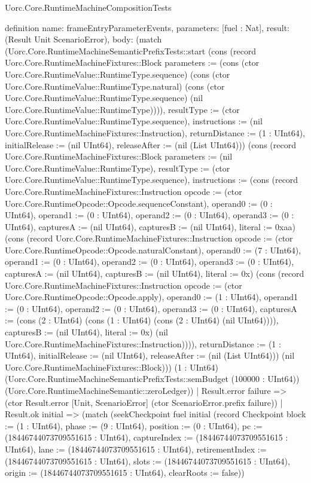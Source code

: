 \begin{lexlean}{Uorc.Core.RuntimeMachineCompositionTests}
\begin{semanticmodule}
definition{
  name: frameEntryParameterEvents,
  parameters: [fuel : Nat],
  result: (Result Unit ScenarioError),
  body: (match (Uorc.Core.RuntimeMachineSemanticPrefixTests::start (cons (record Uorc.Core.RuntimeMachineFixtures::Block {parameters := (cons (ctor Uorc.Core.RuntimeValue::RuntimeType.sequence) (cons (ctor Uorc.Core.RuntimeValue::RuntimeType.natural) (cons (ctor Uorc.Core.RuntimeValue::RuntimeType.sequence) (nil Uorc.Core.RuntimeValue::RuntimeType)))), resultType := (ctor Uorc.Core.RuntimeValue::RuntimeType.sequence), instructions := (nil Uorc.Core.RuntimeMachineFixtures::Instruction), returnDistance := (1 : UInt64), initialRelease := (nil UInt64), releaseAfter := (nil (List UInt64))}) (cons (record Uorc.Core.RuntimeMachineFixtures::Block {parameters := (nil Uorc.Core.RuntimeValue::RuntimeType), resultType := (ctor Uorc.Core.RuntimeValue::RuntimeType.sequence), instructions := (cons (record Uorc.Core.RuntimeMachineFixtures::Instruction {opcode := (ctor Uorc.Core.RuntimeOpcode::Opcode.sequenceConstant), operand0 := (0 : UInt64), operand1 := (0 : UInt64), operand2 := (0 : UInt64), operand3 := (0 : UInt64), capturesA := (nil UInt64), capturesB := (nil UInt64), literal := 0xaa}) (cons (record Uorc.Core.RuntimeMachineFixtures::Instruction {opcode := (ctor Uorc.Core.RuntimeOpcode::Opcode.naturalConstant), operand0 := (7 : UInt64), operand1 := (0 : UInt64), operand2 := (0 : UInt64), operand3 := (0 : UInt64), capturesA := (nil UInt64), capturesB := (nil UInt64), literal := 0x}) (cons (record Uorc.Core.RuntimeMachineFixtures::Instruction {opcode := (ctor Uorc.Core.RuntimeOpcode::Opcode.apply), operand0 := (1 : UInt64), operand1 := (0 : UInt64), operand2 := (0 : UInt64), operand3 := (0 : UInt64), capturesA := (cons (2 : UInt64) (cons (1 : UInt64) (cons (2 : UInt64) (nil UInt64)))), capturesB := (nil UInt64), literal := 0x}) (nil Uorc.Core.RuntimeMachineFixtures::Instruction)))), returnDistance := (1 : UInt64), initialRelease := (nil UInt64), releaseAfter := (nil (List UInt64))}) (nil Uorc.Core.RuntimeMachineFixtures::Block))) (1 : UInt64) (Uorc.Core.RuntimeMachineSemanticPrefixTests::semBudget (100000 : UInt64)) (Uorc.Core.RuntimeMachineSemantic::zeroLedger))
    | Result.error failure => (ctor Result.error [Unit, ScenarioError] (ctor ScenarioError.prefix failure))
    | Result.ok initial => (match (seekCheckpoint fuel initial (record Checkpoint {block := (1 : UInt64), phase := (9 : UInt64), position := (0 : UInt64), pc := (18446744073709551615 : UInt64), captureIndex := (18446744073709551615 : UInt64), lane := (18446744073709551615 : UInt64), retirementIndex := (18446744073709551615 : UInt64), slots := (18446744073709551615 : UInt64), origin := (18446744073709551615 : UInt64), clearRoots := false}))
}
\end{semanticmodule}
\end{lexlean}
